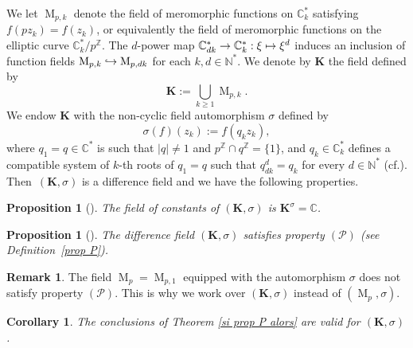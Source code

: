 \documentclass[11pt]{article}
\newcommand{\cf}{cf.\xspace}
\numberwithin{equation}{section}\providecommand{\loccit}{\textit{loc.\ cit.}}
\let\mathcal\mathscr
\newcommand\mto{\mathchoice{\longmapsto}{\mapsto}{\mapsto}{\mapsto}}
\newcommand\hto{\mathrel{\lhook\joinrel\to}}
\newtheorem{prop}[theo]{Proposition}
\newtheorem{coro}[theo]{Corollary}
\theoremstyle{definition}
\newtheorem{remark}[theo]{Remark}
\newcommand{\N}{\mathbb N}
\newcommand{\Z}{\mathbb Z}
\newcommand{\C}{\mathbb C}
\newcommand\K{\boldsymbol{K}}
\let\s\sigma
\newcommand{\propP}{(\mathcal{P})}
\newcommand{\mero}{\operatorname{M}}
\begin{document}
We let $\mero_{p,k}$ denote the field of meromorphic functions on $\C^{*}_k$ satisfying $f(pz_k)=f(z_k)$, or equivalently the field of meromorphic functions on the elliptic curve $\C^{*}_k/p^\Z$. The $d$-power map $\C^{*}_{dk}\to \C^{*}_k:\xi\mto \xi^d$ induces an inclusion of function fields $\mero_{p,k}\hto\mero_{p,dk}$ for each $k,d\in\N^{*}$. We denote by $\K$ the field defined by
\[
\K:=
\bigcup_{k \geq 1} \mero_{p,k}.
\]
We endow $\K$ with the non-cyclic field automorphism
$\s$ defined by
\begin{equation}\label{sigma-def}
\s (f)(z_k):=f(q_kz_k),
\end{equation}
where $q_1=q\in \C^{*}$ is such that $\vert q \vert \neq 1$ and $p^{\Z} \cap q^{\Z}=\{1\}$, and $q_k\in\C^{*}_k$ defines a compatible system of $k$-th roots of $q_1=q$ such that $q_{dk}^d=q_k$ for every $d\in\N^{*}$ (\cf \cite[\S 2]{Hen97}).
Then~$(\K,\s)$ is a difference field and we have the following properties.

\begin{prop}[{\cite[Prop.\,5]{dreyfus2015galois}}]
The field of constants of $(\K,\s)$ is
\hbox{$\K^{\s}=\C$}.
\end{prop}

\begin{prop}[{\cite[Prop.\,6]{dreyfus2015galois}}]
The difference field $(\K,\s)$ satisfies property $\propP$ (see Definition~\ref{prop P}).
\end{prop}

\begin{remark}
The field $\mero_{p}=\mero_{p,1}$ equipped with the automorphism $\s$ does not satisfy property $\propP$. This is why we work over $(\K,\s)$ instead of $(\mero_{p},\s)$.
\end{remark}

\begin{coro}\label{coro1}
The conclusions of Theorem \ref{si prop P alors} are valid for $(\K,\s)$.
\end{coro}
\end{document}
